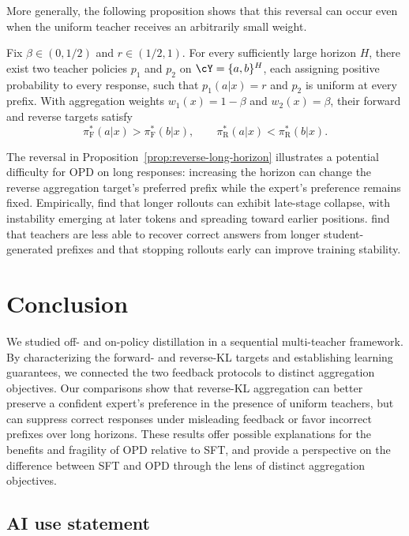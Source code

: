 \documentclass[11pt]{article}
\newcommand{\pif}{\pi_{\mathrm{F}}}
\newcommand{\pir}{\pi_{\mathrm{R}}}
\begin{document}
More generally, the following proposition shows that this reversal can occur even when the uniform teacher receives an arbitrarily small weight.
\begin{proposition}
\label{prop:reverse-long-horizon}
Fix $\beta\in(0,1/2)$ and $r\in(1/2,1)$. For every sufficiently large horizon $H$, there exist two teacher policies $p_1$ and $p_2$ on $\cY=\{a,b\}^H$, each assigning positive probability to every response, such that $p_1(a|x)=r$ and $p_2$ is uniform at every prefix. With aggregation weights $w_1(x)=1-\beta$ and $w_2(x)=\beta$, their forward and reverse targets satisfy
\[
    \pif^*(a|x)>\pif^*(b|x),
    \qquad
    \pir^*(a|x)<\pir^*(b|x).
\]
\end{proposition}
\begin{remark}
The reversal in Proposition~\ref{prop:reverse-long-horizon} illustrates a potential difficulty for OPD on long responses: increasing the horizon can change the reverse aggregation target's preferred prefix while the expert's preference remains fixed. Empirically, \citet{li2026rethinking} find that longer rollouts can exhibit late-stage collapse, with instability emerging at later tokens and spreading toward earlier positions. \citet{ziheng2026less} find that teachers are less able to recover correct answers from longer student-generated prefixes and that stopping rollouts early can improve training stability.
\end{remark}
\section{Conclusion}
We studied off- and on-policy distillation in a sequential multi-teacher framework. By characterizing the forward- and reverse-KL targets and establishing learning guarantees, we connected the two feedback protocols to distinct aggregation objectives. Our comparisons show that reverse-KL aggregation can better preserve a confident expert's preference in the presence of uniform teachers, but can suppress correct responses under misleading feedback or favor incorrect prefixes over long horizons. These results offer possible explanations for the benefits and fragility of OPD relative to SFT, and provide a perspective on the difference between SFT and OPD through the lens of distinct aggregation objectives.


\subsection*{AI use statement}
\end{document}
